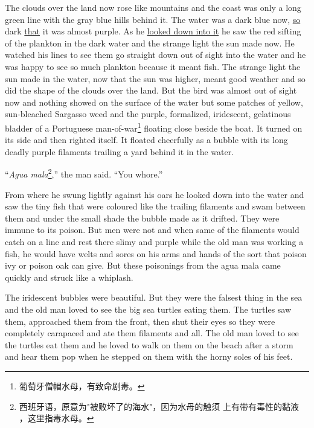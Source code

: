 The clouds over the land now rose like mountains and the coast was only a
long green line with the gray blue hills behind it. The water was a dark
blue now, \uline{so} dark \uline{that} it was almost purple. As he \uline{looked down into it}
he saw the red sifting of the \gls{plankton} in the dark water and the
strange light the sun made now. He watched his lines to see them go straight
down out of sight into the water and he was happy to see so much plankton
because it \gls{meant} fish. The strange light the sun made in the water,
now that the sun was higher, meant good weather and so did the shape of the
clouds over the land. But the bird was almost out of sight now and nothing
showed on the surface of the water but some patches of yellow,
sun-\gls{bleached} \gls{Sargasso} \gls{weed} and the purple,
\gls{formalized}, \gls{iridescent}, \gls{gelatinous} \gls{bladder} of a
Portuguese man-of-war\footnote{葡萄牙僧帽水母，有致命剧毒。} floating close
beside the boat. It turned on its side and then righted itself. It floated
cheerfully as a \gls{bubble} with its long deadly purple \glspl{filament}
\gls{trailing} a \gls{yard} behind it in the water.

``\emph{Agua mala}\footnote{西班牙语，原意为"被败坏了的海水"，因为水母的触须
  上有带有毒性的黏液 ，这里指毒水母。},'' the man said. ``You \gls{whore}.''

From where he \gls{swung} lightly against his oars he looked down into the
water and saw the tiny fish that were coloured like the trailing filaments
and swam between them and under the small shade the bubble made as it
drifted. They were \gls{immune} to its \gls{poison}. But men were not and
when same of the filaments would catch on a line and rest there \gls{slimy}
and purple while the old man was working a fish, he would have \glspl{welt}
and \glspl{sore} on his arms and hands of the sort that poison \gls{ivy} or poison
\gls{oak} can give. But these \glspl{poisoning} from the agua mala came quickly and
\gls{struck} like a \gls{whiplash}.

The iridescent bubbles were beautiful. But they were the \gls{falsest} thing
in the sea and the old man loved to see the big sea turtles eating
them. The turtles saw them, \gls{approached} them from the front, then shut
their eyes so they were completely \gls{carapaced} and ate them filaments
and all. The old man loved to see the turtles eat them and he loved to walk
on them on the beach after a storm and hear them pop when he stepped on them
with the \gls{horny} \glspl{sole} of his feet.

